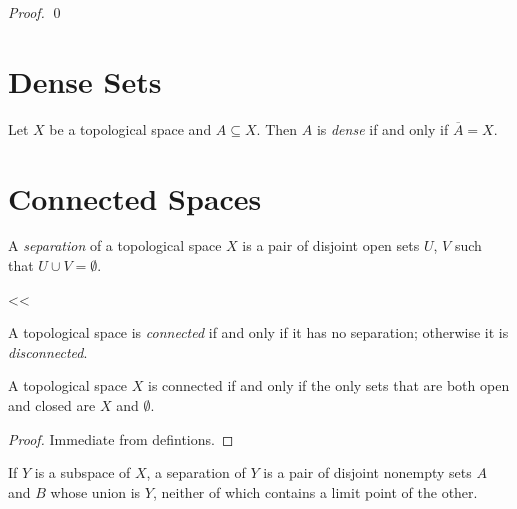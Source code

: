 \begin{proof}
    \pf
    \qed
\end{proof}
\section{Dense Sets}

\begin{definition}[Dense]
    Let $X$ be a topological space and $A \subseteq X$. Then $A$ is \emph{dense}
    if and only if $\overline{A} = X$.
\end{definition}

\section{Connected Spaces}

\begin{definition}[Separation]
    A \emph{separation} of a topological space $X$ is a pair of disjoint open sets $U$, $V$ such that $U \cup V = \emptyset$.
\end{definition}<<

\begin{definition}[Connected]
    A topological space is \emph{connected} if and only if it has no separation; otherwise it is \emph{disconnected}.
\end{definition}

\begin{proposition}
    \label{proposition:open_closed_connective}
    A topological space $X$ is connected if and only if the only sets that are both open and closed are $X$ and $\emptyset$.
\end{proposition}

\begin{proof}
    Immediate from defintions.
\end{proof}

\begin{lemma}
    \label{lemma:limit_point_separation}
    If $Y$ is a subspace of $X$, a separation of $Y$ is a pair of disjoint nonempty sets $A$ and $B$ whose union is $Y$, neither of which contains a limit point of the other.
\end{lemma}

